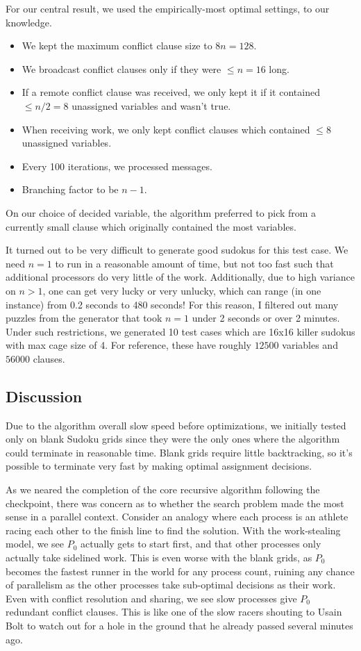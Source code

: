 \documentclass{article}
\begin{document}
For our central result, we used the empirically-most optimal settings, to our knowledge.
\begin{itemize}
    \item We kept the maximum conflict clause size to $8n = 128$.
    \item We broadcast conflict clauses only if they were $\leq n=16$ long.
    \item If a remote conflict clause was received, we only kept it if it contained $\leq n/2 = 8$ unassigned variables and wasn't true.
    \item When receiving work, we only kept conflict clauses which contained $\leq 8$ unassigned variables.
    \item Every 100 iterations, we processed messages.
    \item Branching factor to be $n-1$.
\end{itemize}

On our choice of decided variable, the algorithm preferred to pick from a currently small clause which originally contained the most variables.

It turned out to be very difficult to generate good sudokus for this test case.
We need $n=1$ to run in a reasonable amount of time, but not too fast such that additional processors do very little of the work.
Additionally, due to high variance on $n>1$, one can get very lucky or very unlucky, which can range (in one instance) from 0.2 seconds to 480 seconds!
For this reason, I filtered out many puzzles from the generator that took $n=1$ under 2 seconds or over 2 minutes.
Under such restrictions, we generated 10 test cases which are 16x16 killer sudokus with max cage size of 4.
For reference, these have roughly $12500$ variables and $56000$ clauses.

\subsection{Discussion}

Due to the algorithm overall slow speed before optimizations, we initially tested only on blank Sudoku grids since they were the only ones where the algorithm could terminate in reasonable time. Blank grids require little backtracking, so it's possible to terminate very fast by making optimal assignment decisions. 

As we neared the completion of the core recursive algorithm following the checkpoint, there was concern as to whether the search problem made the most sense in a parallel context. Consider an analogy where each process is an athlete racing each other to the finish line to find the solution. With the work-stealing model, we see $P_0$ actually gets to start first, and that other processes only actually take sidelined work. This is even worse with the blank grids, as $P_0$ becomes the fastest runner in the world for any process count, ruining any chance of parallelism as the other processes take sub-optimal decisions as their work. Even with conflict resolution and sharing, we see slow processes give $P_0$ redundant conflict clauses. This is like one of the slow racers shouting to Usain Bolt to watch out for a hole in the ground that he already passed several minutes ago. 
\end{document}
